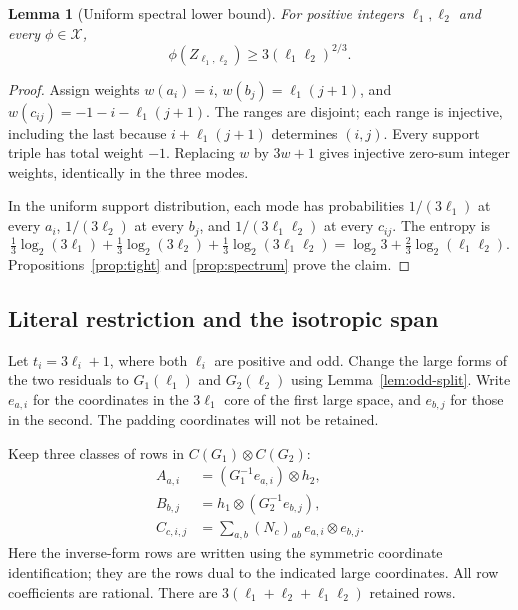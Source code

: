 \documentclass[11pt]{article}
\newtheorem{lemma}[theorem]{Lemma}
\theoremstyle{definition}\newtheorem{definition}[theorem]{Definition}
\theoremstyle{remark}\newtheorem{remark}[theorem]{Remark}
\newcommand{\X}{\mathcal X}
\begin{document}
\begin{lemma}[Uniform spectral lower bound]\label{lem:Z}
For positive integers $\ell_1,\ell_2$ and every $\phi\in\X$,
\begin{equation}\label{eq:Z-value}
 \phi(Z_{\ell_1,\ell_2})\geq3(\ell_1\ell_2)^{2/3}.
\end{equation}
\end{lemma}
\begin{proof}
Assign weights $w(a_i)=i$, $w(b_j)=\ell_1(j+1)$, and $w(c_{ij})=-1-i-\ell_1(j+1)$. The ranges are disjoint; each range is injective, including the last because $i+\ell_1(j+1)$ determines $(i,j)$. Every support triple has total weight $-1$. Replacing $w$ by $3w+1$ gives injective zero-sum integer weights, identically in the three modes.

In the uniform support distribution, each mode has probabilities $1/(3\ell_1)$ at every $a_i$, $1/(3\ell_2)$ at every $b_j$, and $1/(3\ell_1\ell_2)$ at every $c_{ij}$. The entropy is
\[
 \tfrac13\log_2(3\ell_1)+\tfrac13\log_2(3\ell_2)+\tfrac13\log_2(3\ell_1\ell_2)
 =\log_2 3+\tfrac23\log_2(\ell_1\ell_2).
\]
Propositions~\ref{prop:tight} and \ref{prop:spectrum} prove the claim.
\end{proof}

\subsection{Literal restriction and the isotropic span}

Let $t_i=3\ell_i+1$, where both $\ell_i$ are positive and odd. Change the large forms of the two residuals to $G_1(\ell_1)$ and $G_2(\ell_2)$ using Lemma~\ref{lem:odd-split}. Write $e_{a,i}$ for the coordinates in the $3\ell_1$ core of the first large space, and $e_{b,j}$ for those in the second. The padding coordinates will not be retained.

Keep three classes of rows in $C(G_1)\otimes C(G_2)$:
\begin{align}
 A_{a,i}&=(G_1^{-1}e_{a,i})\otimes h_2,\label{eq:retained-rows}\\
 B_{b,j}&=h_1\otimes(G_2^{-1}e_{b,j}),\nonumber\\
 C_{c,i,j}&=\sum_{a,b}(N_c)_{ab}\,e_{a,i}\otimes e_{b,j}.\nonumber
\end{align}
Here the inverse-form rows are written using the symmetric coordinate identification; they are the rows dual to the indicated large coordinates. All row coefficients are rational. There are $3(\ell_1+\ell_2+\ell_1\ell_2)$ retained rows.
\end{document}
